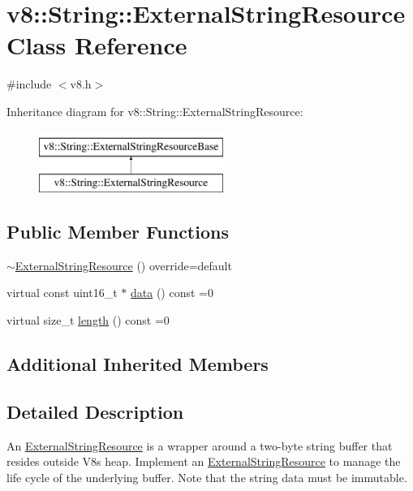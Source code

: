 \hypertarget{classv8_1_1String_1_1ExternalStringResource}{}\section{v8\+:\+:String\+:\+:External\+String\+Resource Class Reference}
\label{classv8_1_1String_1_1ExternalStringResource}


{\ttfamily \#include $<$v8.\+h$>$}

Inheritance diagram for v8\+:\+:String\+:\+:External\+String\+Resource\+:\begin{figure}[H]
\begin{center}
\leavevmode
\includegraphics[height=2.000000cm]{classv8_1_1String_1_1ExternalStringResource}
\end{center}
\end{figure}
\subsection*{Public Member Functions}
\begin{DoxyCompactItemize}
\item 
\mbox{\hyperlink{classv8_1_1String_1_1ExternalStringResource_ad5f8c0ca1ed53d7c1ec7b11dc0aef49c}{$\sim$\+External\+String\+Resource}} () override=default
\item 
virtual const uint16\+\_\+t $\ast$ \mbox{\hyperlink{classv8_1_1String_1_1ExternalStringResource_a987309199b848511adb708e221e0fb0a}{data}} () const =0
\item 
virtual size\+\_\+t \mbox{\hyperlink{classv8_1_1String_1_1ExternalStringResource_ab5ca300fea077d7c7774ec49d32e4da1}{length}} () const =0
\end{DoxyCompactItemize}
\subsection*{Additional Inherited Members}


\subsection{Detailed Description}
An \mbox{\hyperlink{classv8_1_1String_1_1ExternalStringResource}{External\+String\+Resource}} is a wrapper around a two-\/byte string buffer that resides outside V8\textquotesingle{}s heap. Implement an \mbox{\hyperlink{classv8_1_1String_1_1ExternalStringResource}{External\+String\+Resource}} to manage the life cycle of the underlying buffer. Note that the string data must be immutable. 

